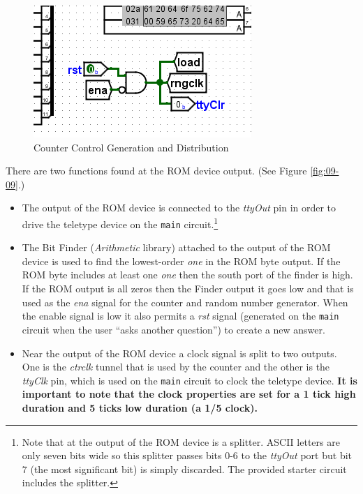 \begin{figure}[H]
	\centering
	\includegraphics[width=\maxwidth{.95\linewidth}]{gfx/09-08}
	\caption{Counter Control Generation and Distribution}
	\label{fig:09-08}
\end{figure}

There are two functions found at the ROM device output. (See Figure \ref{fig:09-09}.)

\begin{itemize}
	\item The output of the ROM device is connected to the \textit{ttyOut} pin in order to drive the teletype device on the \lstinline[columns=fixed]|main| circuit.\footnote{Note that at the output of the ROM device is a splitter. ASCII letters are only seven bits wide so this splitter passes bits 0-6 to the \textit{ttyOut} port but bit 7 (the most significant bit) is simply discarded. The provided starter circuit includes the splitter.}

	\item The Bit Finder (\textit{Arithmetic} library) attached to the output of the ROM device is used to find the lowest-order \textit{one} in the ROM byte output. If the ROM byte includes at least one \textit{one} then the south port of the finder is high. If the ROM output is all zeros then the Finder output it goes low and that is used as the \textit{ena} signal for the counter and random number generator. When the enable signal is low it also permits a \textit{rst} signal (generated on the \lstinline[columns=fixed]|main| circuit when the user ``asks another question'') to create a new answer.
	
	\item Near the output of the ROM device a clock signal is split to two outputs. One is the \textit{ctrclk} tunnel that is used by the counter and the other is the \textit{ttyClk} pin, which is used on the \lstinline[columns=fixed]|main| circuit to clock the teletype device. \textbf{It is important to note that the clock properties are set for a 1 tick high duration and 5 ticks low duration (a 1/5 clock).}
\end{itemize}


